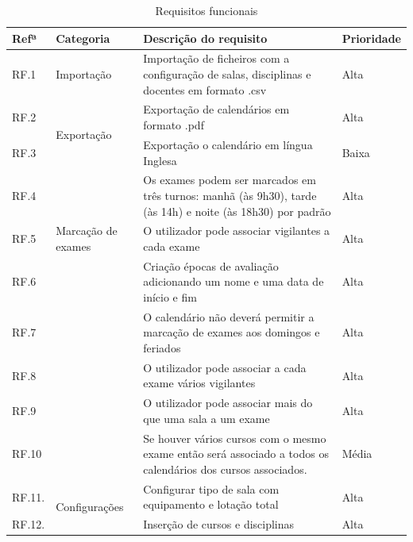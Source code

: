 \documentclass[11pt, twoside]{report}
\begin{document}
\def\arraystretch{1.5}%
	\begin{center}
		\label{requisitiosfuncionais}
		\begin{longtable}{|m{1cm}|m{2.2cm}|m{10cm}|m{2cm}|}
			\caption{Requisitos funcionais}\\
			
			\hline			
			\textbf{Refª }	& \textbf{Categoria}&\textbf{Descrição do requisito} & \textbf{Prioridade} \\
			\hline
			
			
			RF.1 &Importação& Importação de ficheiros com a configuração de salas, disciplinas e docentes em formato .csv & Alta \\
			\hline
			
			RF.2 &\multirow{2}{2cm}{Exportação}& Exportação de calendários em formato .pdf & Alta \\
			
			RF.3 && Exportação o calendário em língua Inglesa & Baixa \\
			\hline
			
			RF.4 &\multirow{3}{2cm}{Marcação de exames}& Os exames podem ser marcados em três turnos: manhã (às 9h30), tarde (às 14h) e noite (às 18h30) por padrão & Alta \\
			
			RF.5 && O utilizador pode associar vigilantes a cada exame & Alta \\
			
			RF.6 && Criação épocas de avaliação adicionando um nome e uma data de início e fim & Alta \\
			
			RF.7 && O calendário não deverá permitir a marcação de exames aos domingos e feriados & Alta \\
			RF.8 &&O utilizador pode associar a cada exame vários vigilantes & Alta\\
			
			RF.9 &&	O utilizador pode associar mais do que uma sala a um exame & Alta\\
			
			RF.10 && Se houver vários cursos com o mesmo exame então será associado a todos os calendários dos cursos associados. & Média\\
			\hline
		
			RF.11. &\multirow{6}{2cm}{Configurações}& Configurar tipo de sala com equipamento e lotação total & Alta \\
			
			RF.12. & 	& Inserção de cursos e disciplinas & Alta\\
			

\end{longtable}
\end{center}
\end{document}
